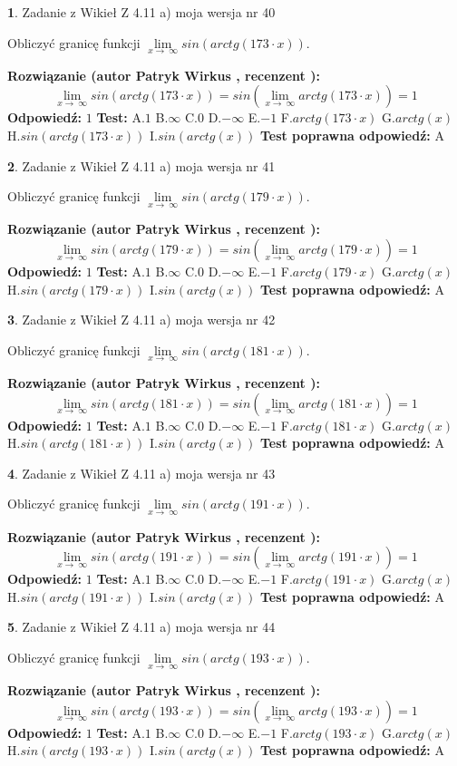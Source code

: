 \documentclass[12pt, a4paper]{article}
\theoremstyle{definition} %
\newtheorem{zad}{}
\newcommand{\zadStart}[1]{\begin{zad}#1\newline}
\newcommand{\zadStop}{\end{zad}}
\newcommand{\rozwStart}[2]{\noindent \textbf{Rozwiązanie (autor #1 , recenzent #2): }\newline}
\newcommand{\rozwStop}{\newline}
\newcommand{\odpStart}{\noindent \textbf{Odpowiedź:}\newline}
\newcommand{\odpStop}{\newline}
\newcommand{\testStart}{\noindent \textbf{Test:}\newline}
\newcommand{\testStop}{\newline}
\newcommand{\kluczStart}{\noindent \textbf{Test poprawna odpowiedź:}\newline}
\newcommand{\kluczStop}{\newline}
\begin{document}
\zadStart{Zadanie z Wikieł Z 4.11 a) moja wersja nr 40}

Obliczyć granicę funkcji  $\lim\limits_{x\to\ \infty}sin(arctg(173\cdot x))$.
\zadStop
\rozwStart{Patryk Wirkus}{}
$$\lim\limits_{x\to\ \infty}sin(arctg(173\cdot x)) = sin(\lim\limits_{x\to\ \infty}arctg(173\cdot x)) = 1$$
\rozwStop
\odpStart
$1$
\odpStop
\testStart
A.$1$ B.$\infty$ C.$0$ D.$-\infty$ E.$-1$
F.$arctg(173\cdot x)$ G.$arctg(x)$
H.$sin(arctg(173\cdot x))$
I.$sin(arctg(x))$
\testStop
\kluczStart
A
\kluczStop



\zadStart{Zadanie z Wikieł Z 4.11 a) moja wersja nr 41}

Obliczyć granicę funkcji  $\lim\limits_{x\to\ \infty}sin(arctg(179\cdot x))$.
\zadStop
\rozwStart{Patryk Wirkus}{}
$$\lim\limits_{x\to\ \infty}sin(arctg(179\cdot x)) = sin(\lim\limits_{x\to\ \infty}arctg(179\cdot x)) = 1$$
\rozwStop
\odpStart
$1$
\odpStop
\testStart
A.$1$ B.$\infty$ C.$0$ D.$-\infty$ E.$-1$
F.$arctg(179\cdot x)$ G.$arctg(x)$
H.$sin(arctg(179\cdot x))$
I.$sin(arctg(x))$
\testStop
\kluczStart
A
\kluczStop



\zadStart{Zadanie z Wikieł Z 4.11 a) moja wersja nr 42}

Obliczyć granicę funkcji  $\lim\limits_{x\to\ \infty}sin(arctg(181\cdot x))$.
\zadStop
\rozwStart{Patryk Wirkus}{}
$$\lim\limits_{x\to\ \infty}sin(arctg(181\cdot x)) = sin(\lim\limits_{x\to\ \infty}arctg(181\cdot x)) = 1$$
\rozwStop
\odpStart
$1$
\odpStop
\testStart
A.$1$ B.$\infty$ C.$0$ D.$-\infty$ E.$-1$
F.$arctg(181\cdot x)$ G.$arctg(x)$
H.$sin(arctg(181\cdot x))$
I.$sin(arctg(x))$
\testStop
\kluczStart
A
\kluczStop



\zadStart{Zadanie z Wikieł Z 4.11 a) moja wersja nr 43}

Obliczyć granicę funkcji  $\lim\limits_{x\to\ \infty}sin(arctg(191\cdot x))$.
\zadStop
\rozwStart{Patryk Wirkus}{}
$$\lim\limits_{x\to\ \infty}sin(arctg(191\cdot x)) = sin(\lim\limits_{x\to\ \infty}arctg(191\cdot x)) = 1$$
\rozwStop
\odpStart
$1$
\odpStop
\testStart
A.$1$ B.$\infty$ C.$0$ D.$-\infty$ E.$-1$
F.$arctg(191\cdot x)$ G.$arctg(x)$
H.$sin(arctg(191\cdot x))$
I.$sin(arctg(x))$
\testStop
\kluczStart
A
\kluczStop



\zadStart{Zadanie z Wikieł Z 4.11 a) moja wersja nr 44}

Obliczyć granicę funkcji  $\lim\limits_{x\to\ \infty}sin(arctg(193\cdot x))$.
\zadStop
\rozwStart{Patryk Wirkus}{}
$$\lim\limits_{x\to\ \infty}sin(arctg(193\cdot x)) = sin(\lim\limits_{x\to\ \infty}arctg(193\cdot x)) = 1$$
\rozwStop
\odpStart
$1$
\odpStop
\testStart
A.$1$ B.$\infty$ C.$0$ D.$-\infty$ E.$-1$
F.$arctg(193\cdot x)$ G.$arctg(x)$
H.$sin(arctg(193\cdot x))$
I.$sin(arctg(x))$
\testStop
\kluczStart
A
\kluczStop
\end{document}
